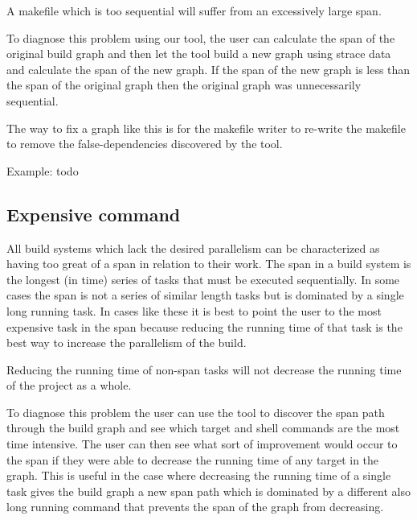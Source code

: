 \documentclass[twocolumn,sigplan,10pt,review]{acmart}
\begin{document}
A makefile which is too sequential will suffer from an excessively large span.

To diagnose this problem using our tool, the user can calculate the span of the original build
graph and then let the tool build a new graph using strace data and calculate the span of the
new graph.  If the span of the new graph is less than the span of the original graph then the
original graph was unnecessarily sequential.

The way to fix a graph like this is for the makefile writer to re-write the makefile to
remove the false-dependencies discovered by the tool.

Example: todo

\subsection{Expensive command}

All build systems which lack the desired parallelism can be characterized as having too great of
a span in relation to their work.  The span in a build system is the longest (in time) series of
tasks that must be executed sequentially.  In some cases the span is not a series of similar length
tasks but is dominated by a single long running task.  In cases like these it is best to point the
user to the most expensive task in the span because reducing the running time of that task is the
best way to increase the parallelism of the build.

Reducing the running time of non-span tasks will not decrease the running time of the project as
a whole.

To diagnose this problem the user can use the tool to discover the span path through the build
graph and see which target and shell commands are the most time intensive.  The user can then see
what sort of improvement would occur to the span if they were able to decrease the running
time of any target in the graph.  This is useful in the case where decreasing the running time
of a single task gives the build graph a new span path which is dominated by a different also
long running command that prevents the span of the graph from decreasing.
\end{document}
